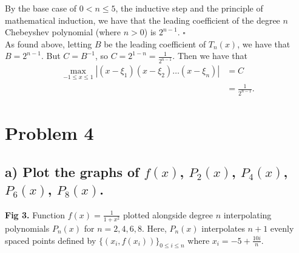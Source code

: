 \documentclass[11pt, letterpaper]{article}
\begin{document}
\noindent By the base case of $0 < n\leq 5$, the inductive step and the principle of mathematical induction,
we have that the leading coefficient of the degree $n$ Chebeyshev polynomial (where $n>0$) is $2^{n-1}$. \indent\indent\indent\indent\indent\indent\indent\indent$\square$\\

\noindent As found above, letting $B$ be the leading coefficient of $T_n(x)$, we have that $B=2^{n-1}$. 
But $C=B^{-1}$, so $C=2^{1-n}=\frac{1}{2^{n-1}}$. Then we have that
\begin{align*}
    \max_{-1\leq x\leq 1}|(x-\xi_1)(x-\xi_2)\dots(x-\xi_n)|&=C\\
    &=\frac{1}{2^{n-1}}.
\end{align*}

\section*{Problem 4}

    \subsection*{a) \normalfont Plot the graphs of $f(x)$, $P_2(x)$, $P_4(x)$, $P_6(x)$, $P_8(x)$.}
    \begin{center}
    \end{center}
    {\bf Fig 3.} Function $f(x)=\frac{1}{1+x^2}$ plotted alongside degree $n$ interpolating polynomials $P_n(x)$ for 
    $n=2,4,6,8$. Here, $P_n(x)$ interpolates $n+1$ evenly spaced points defined by $\{(x_i, f(x_i))\}_{0\leq i\leq n}$
    where $x_i=-5+\frac{10i}{n}$.
\end{document}
